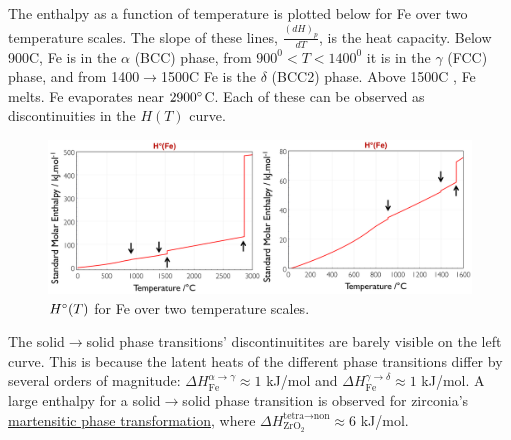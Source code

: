 \documentclass[12pt]{article}
\begin{document}
The enthalpy as a function of temperature is plotted below for Fe over two temperature scales. The slope of these lines, $\frac{(dH)_p}{dT}$, is the heat capacity.  Below 900\degree C, Fe is in the $\alpha$ (BCC) phase, from $900^0 < T < 1400^0$ it is in the $\gamma$ (FCC) phase, and from 1400$\to$1500\degree C Fe is the $\delta$ (BCC2) phase. Above 1500\degree C , Fe melts. Fe evaporates near $2900 \degree$C. Each of these can be observed as discontinuities in the $H(T)$ curve. \\
\begin{figure}[h]
\centering
\includegraphics[width = \textwidth]{H_of_T_labeled.png}
\caption{$H\degree (T)$ for Fe over two temperature scales.}
\label{enthalpy_vs_T}
\end{figure}
The solid$\to$solid phase transitions' discontinuitites are barely visible on the left curve. This is because the latent heats of the different phase transitions differ by several orders of magnitude: $\Delta H_\text{Fe}^{\alpha \rightarrow \gamma} \approx 1$ kJ/mol and $\Delta H_\text{Fe}^{\gamma \rightarrow \delta} \approx 1$ kJ/mol. A large enthalpy for a solid$\to$solid phase transition is observed for zirconia's \href{http://en.wikipedia.org/wiki/Diffusionless_transformation#Martensitic_transformation}{martensitic phase transformation}, where $\Delta H_{\text{ZrO}_2}^{\text{tetra}\rightarrow \text{non}} \approx 6$ kJ/mol.  
\end{document}
